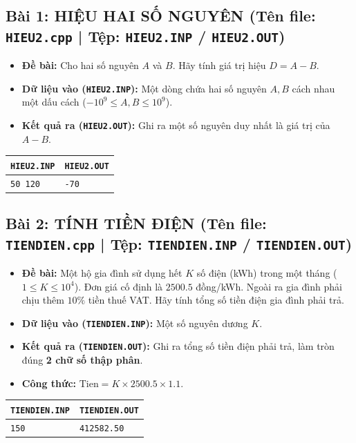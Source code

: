 \documentclass[11pt,a4paper]{article}
\begin{document}
\subsection*{\color{AsianDarkBlue}\small Bài 1: HIỆU HAI SỐ NGUYÊN (Tên file: \texttt{HIEU2.cpp} | Tệp: \texttt{HIEU2.INP} / \texttt{HIEU2.OUT})}
\begin{itemize}
    \setlength{\itemsep}{0.5pt}
    \footnotesize
    \item \textbf{Đề bài:} Cho hai số nguyên $A$ và $B$. Hãy tính giá trị hiệu $D = A - B$.
    \item \textbf{Dữ liệu vào (\texttt{HIEU2.INP}):} Một dòng chứa hai số nguyên $A, B$ cách nhau một dấu cách ($-10^9 \le A, B \le 10^9$).
    \item \textbf{Kết quả ra (\texttt{HIEU2.OUT}):} Ghi ra một số nguyên duy nhất là giá trị của $A - B$.
\end{itemize}
\vspace{-2mm}
\begin{center}
\footnotesize
\begin{tabular}{|p{7.8cm}|p{7.8cm}|}
\hline
\textbf{\texttt{HIEU2.INP}} & \textbf{\texttt{HIEU2.OUT}} \\
\hline
\texttt{50 120} & \texttt{-70} \\
\hline
\end{tabular}
\end{center}

\vspace{-2mm}
\subsection*{\color{AsianDarkBlue}\small Bài 2: TÍNH TIỀN ĐIỆN (Tên file: \texttt{TIENDIEN.cpp} | Tệp: \texttt{TIENDIEN.INP} / \texttt{TIENDIEN.OUT})}
\begin{itemize}
    \setlength{\itemsep}{0.5pt}
    \footnotesize
    \item \textbf{Đề bài:} Một hộ gia đình sử dụng hết $K$ số điện (kWh) trong một tháng ($1 \le K \le 10^4$). Đơn giá cố định là $2500.5$ đồng/kWh. Ngoài ra gia đình phải chịu thêm $10\%$ tiền thuế VAT. Hãy tính tổng số tiền điện gia đình phải trả.
    \item \textbf{Dữ liệu vào (\texttt{TIENDIEN.INP}):} Một số nguyên dương $K$.
    \item \textbf{Kết quả ra (\texttt{TIENDIEN.OUT}):} Ghi ra tổng số tiền điện phải trả, làm tròn đúng \textbf{2 chữ số thập phân}.
    \item \textbf{Công thức:} $\text{Tien} = K \times 2500.5 \times 1.1$.
\end{itemize}
\vspace{-2mm}
\begin{center}
\footnotesize
\begin{tabular}{|p{7.8cm}|p{7.8cm}|}
\hline
\textbf{\texttt{TIENDIEN.INP}} & \textbf{\texttt{TIENDIEN.OUT}} \\
\hline
\texttt{150} & \texttt{412582.50} \\
\hline
\end{tabular}
\end{center}
\end{document}
